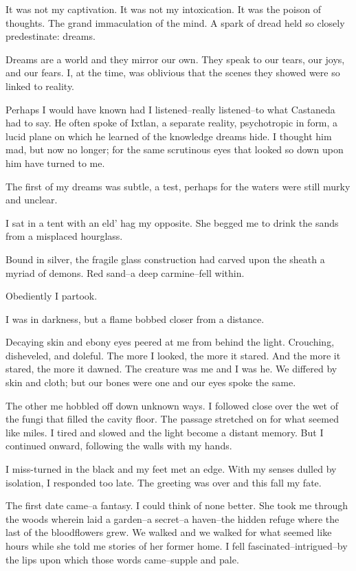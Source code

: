 \documentclass{article}
\begin{document}
It was not my captivation.
It was not my intoxication.
It was the poison of thoughts.
The grand immaculation of the mind.
A spark of dread held so closely predestinate: dreams.
\VV


\noindent
Dreams are a world and they mirror our own.
They speak to our tears, our joys, and our fears.
I, at the time, was oblivious that the scenes they
showed were so linked to reality.


Perhaps I would have known had I listened--really listened--to
what Castaneda had to say.
He often spoke of Ixtlan,
a separate reality,
psychotropic in form,
a lucid plane on which he learned of the knowledge dreams hide.
I thought him mad, but now no longer;
for the same scrutinous eyes that looked so down upon him
have turned to me.
\VV


\noindent
The first of my dreams was subtle, a test, perhaps
for the waters were still murky and unclear.
\VV


\noindent
I sat in a tent with an eld' hag my opposite.
She begged me to drink the sands from a misplaced hourglass.


Bound in silver, the fragile glass construction had
carved upon the sheath a myriad of demons.
Red sand--a deep carmine--fell within.


Obediently I partook.


\noindent
I was in darkness, but a flame bobbed closer from a distance.


Decaying skin and ebony eyes peered at me from behind the light.
Crouching, disheveled, and doleful.
The more I looked, the more it stared.
And the more it stared, the more it dawned.
The creature was me and I was he.
We differed by skin and cloth; but our bones were one
and our eyes spoke the same.


The other me hobbled off down unknown ways.
I followed close over the wet of the fungi that
filled the cavity floor.
The passage stretched on for what seemed like miles.
I tired and slowed and the light become a distant memory.
But I continued onward, following the walls with my hands.


I miss-turned in the black and my feet met an edge.
With my senses dulled by isolation, I responded too late.
The greeting was over and this fall my fate.
\VV


\noindent %
The first date came--a fantasy.
I could think of none better. %
She took me through the woods wherein laid a garden--a
secret--a haven--the hidden refuge where
the last of the bloodflowers grew.
We walked and we walked for what seemed like hours
while she told me stories of her former home.
I fell fascinated--intrigued--by the lips
upon which those words came--supple and pale.
\end{document}
